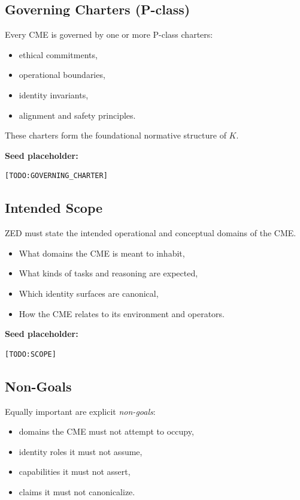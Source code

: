 \subsection{Governing Charters (P-class)}

Every CME is governed by one or more P-class charters:
\begin{itemize}
    \item ethical commitments,
    \item operational boundaries,
    \item identity invariants,
    \item alignment and safety principles.
\end{itemize}

These charters form the foundational normative structure of $K$.

\noindent
\textbf{Seed placeholder:}
\begin{verbatim}
[TODO:GOVERNING_CHARTER]
\end{verbatim}

\subsection{Intended Scope}

ZED must state the intended operational and conceptual domains of the CME.

\begin{itemize}
    \item What domains the CME is meant to inhabit,
    \item What kinds of tasks and reasoning are expected,
    \item Which identity surfaces are canonical,
    \item How the CME relates to its environment and operators.
\end{itemize}

\noindent
\textbf{Seed placeholder:}
\begin{verbatim}
[TODO:SCOPE]
\end{verbatim}

\subsection{Non-Goals}

Equally important are explicit \emph{non-goals}:
\begin{itemize}
    \item domains the CME must not attempt to occupy,
    \item identity roles it must not assume,
    \item capabilities it must not assert,
    \item claims it must not canonicalize.
\end{itemize}

